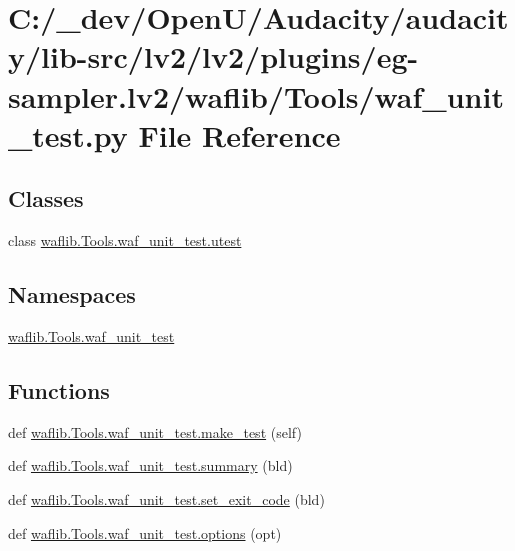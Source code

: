 \hypertarget{lv2_2plugins_2eg-sampler_8lv2_2waflib_2_tools_2waf__unit__test_8py}{}\section{C\+:/\+\_\+dev/\+Open\+U/\+Audacity/audacity/lib-\/src/lv2/lv2/plugins/eg-\/sampler.lv2/waflib/\+Tools/waf\+\_\+unit\+\_\+test.py File Reference}
\label{lv2_2plugins_2eg-sampler_8lv2_2waflib_2_tools_2waf__unit__test_8py}
\subsection*{Classes}
\begin{DoxyCompactItemize}
\item 
class \hyperlink{classwaflib_1_1_tools_1_1waf__unit__test_1_1utest}{waflib.\+Tools.\+waf\+\_\+unit\+\_\+test.\+utest}
\end{DoxyCompactItemize}
\subsection*{Namespaces}
\begin{DoxyCompactItemize}
\item 
 \hyperlink{namespacewaflib_1_1_tools_1_1waf__unit__test}{waflib.\+Tools.\+waf\+\_\+unit\+\_\+test}
\end{DoxyCompactItemize}
\subsection*{Functions}
\begin{DoxyCompactItemize}
\item 
def \hyperlink{namespacewaflib_1_1_tools_1_1waf__unit__test_a480792e43cdb6d6a2bd79b2ec412cf00}{waflib.\+Tools.\+waf\+\_\+unit\+\_\+test.\+make\+\_\+test} (self)
\item 
def \hyperlink{namespacewaflib_1_1_tools_1_1waf__unit__test_ad245dac5d636a5c5f49cb0e232d332f4}{waflib.\+Tools.\+waf\+\_\+unit\+\_\+test.\+summary} (bld)
\item 
def \hyperlink{namespacewaflib_1_1_tools_1_1waf__unit__test_a0f1dc47e6fcefddfd017ce557eb4da42}{waflib.\+Tools.\+waf\+\_\+unit\+\_\+test.\+set\+\_\+exit\+\_\+code} (bld)
\item 
def \hyperlink{namespacewaflib_1_1_tools_1_1waf__unit__test_a8f30080b41250ee5ad33b2ad2df40f0c}{waflib.\+Tools.\+waf\+\_\+unit\+\_\+test.\+options} (opt)
\end{DoxyCompactItemize}
